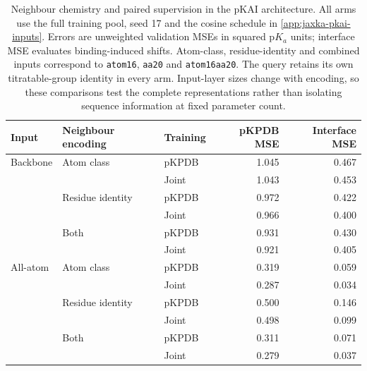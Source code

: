 \begin{table}[p]
    \centering\small
    \begin{tabular}{@{}lllrr@{}}
    \toprule
    Input & Neighbour encoding & Training & pKPDB MSE & Interface MSE \\
    \midrule
    Backbone & Atom class & pKPDB & 1.045 & 0.467 \\
             &            & Joint & 1.043 & 0.453 \\
             & Residue identity & pKPDB & 0.972 & 0.422 \\
             &                  & Joint & 0.966 & 0.400 \\
             & Both & pKPDB & 0.931 & 0.430 \\
             &      & Joint & 0.921 & 0.405 \\
    \midrule
    All-atom & Atom class & pKPDB & 0.319 & 0.059 \\
             &            & Joint & 0.287 & 0.034 \\
             & Residue identity & pKPDB & 0.500 & 0.146 \\
             &                  & Joint & 0.498 & 0.099 \\
             & Both & pKPDB & 0.311 & 0.071 \\
             &      & Joint & 0.279 & 0.037 \\
    \bottomrule
    \end{tabular}
    \caption{Neighbour chemistry and paired supervision in the pKAI architecture. All arms use the full training pool, seed 17 and the cosine schedule in \cref{app:jaxka-pkai-inputs}. Errors are unweighted validation MSEs in squared $\mathrm{p}K_a$ units; interface MSE evaluates binding-induced shifts. Atom-class, residue-identity and combined inputs correspond to \texttt{atom16}, \texttt{aa20} and \texttt{atom16aa20}. The query retains its own titratable-group identity in every arm. Input-layer sizes change with encoding, so these comparisons test the complete representations rather than isolating sequence information at fixed parameter count.}
    \label{tab:jaxka-pkai-encodings}
\end{table}


